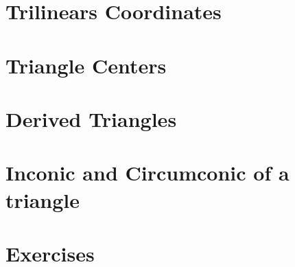 \section{Trilinears Coordinates}
\label{app:Atrilins}


\section{Triangle Centers}
\label{app:Atri-ctrs}


\section{Derived Triangles}
\label{app:Aderived}


\section{Inconic and Circumconic of a triangle}
\label{app:A-inconic}
 


\section{Exercises}
\label{app:A-exercises}


